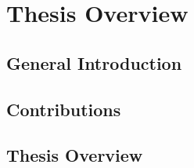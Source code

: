 \chapter{Thesis Overview}
\section{General Introduction}
\section{Contributions}
\section{Thesis Overview}